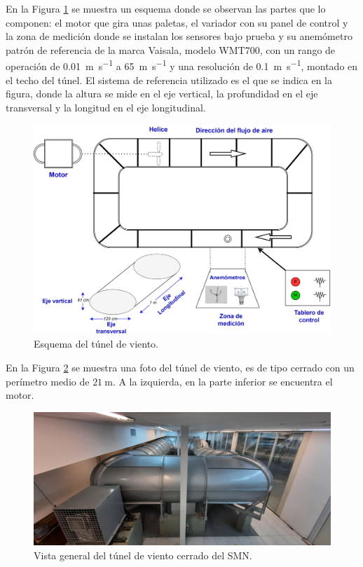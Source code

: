 En la Figura \ref{fig:tunelVientoEsquema} se muestra un esquema donde se observan las partes que lo componen: el motor que gira unas paletas, el variador con su panel de control y la zona de medición donde se instalan los sensores bajo prueba y su anemómetro patrón de referencia de la marca Vaisala, modelo WMT700, con un rango de operación de \SI{0.01}{\meter\per\second} a \SI{65}{\meter\per\second} y una resolución de \SI{0.1}{\meter\per\second}, montado en el techo del túnel. El sistema de referencia utilizado es el que se indica en la figura, donde la altura se mide en el eje vertical, la profundidad en el eje transversal y la longitud en el eje longitudinal.

\begin{figure}[H]
    \centering
    \includegraphics[width=0.9\linewidth]{Figuras/viento/tunelDeViento/TunelVientoEsquema.png}
    \caption{Esquema del túnel de viento.}
    \label{fig:tunelVientoEsquema}
\end{figure}

En la Figura \ref{fig:tuneDeViento2} se muestra una foto del túnel de viento, es de tipo cerrado con un perímetro medio de $\SI{21}{\meter}$. A la izquierda, en la parte inferior se encuentra el motor.

\begin{figure}[H]
    \centering
    \includegraphics[width=0.9\linewidth]{Figuras/viento/tunelDeViento/tuneDeViento2.jpg}
    \caption{Vista general del túnel de viento cerrado del SMN.}
    \label{fig:tuneDeViento2}
\end{figure}

